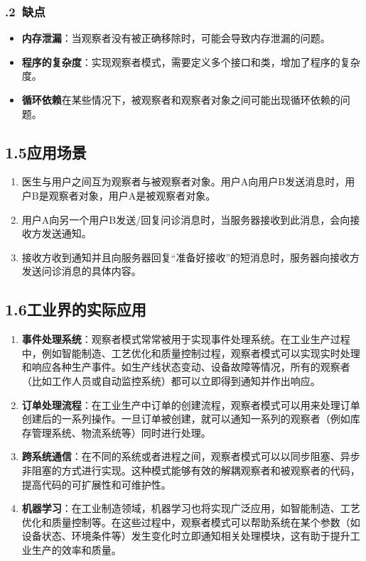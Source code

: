 \documentclass[24pt,a4paper]{article}%
\begin{document}
\subsubsection*{.2\ 缺点}
\begin{itemize}
    \item \textbf{内存泄漏}：当观察者没有被正确移除时，可能会导致内存泄漏的问题。
    \item \textbf{程序的复杂度}：实现观察者模式，需要定义多个接口和类，增加了程序的复杂度。
    \item \textbf{循环依赖}在某些情况下，被观察者和观察者对象之间可能出现循环依赖的问题。
\end{itemize}

\subsection*{\songti 1.5应用场景}
\begin{enumerate}
    \item 医生与用户之间互为观察者与被观察者对象。用户A向用户B发送消息时，用户B是观察者对象，用户A是被观察者对象。
    \item 用户A向另一个用户B发送/回复问诊消息时，当服务器接收到此消息，会向接收方发送通知。
    \item 接收方收到通知并且向服务器回复“准备好接收”的短消息时，服务器向接收方发送问诊消息的具体内容。
\end{enumerate}

\subsection*{\songti 1.6工业界的实际应用}
\begin{enumerate}
    \item \textbf{事件处理系统}：观察者模式常常被用于实现事件处理系统。在工业生产过程中，例如智能制造、工艺优化和质量控制过程，观察者模式可以实现实时处理和响应各种生产事件。如生产线状态变动、设备故障等情况，所有的观察者（比如工作人员或自动监控系统）都可以立即得到通知并作出响应。
    \item \textbf{订单处理流程}：在工业生产中订单的创建流程，观察者模式可以用来处理订单创建后的一系列操作。一旦订单被创建，就可以通知一系列的观察者（例如库存管理系统、物流系统等）同时进行处理。
    \item \textbf{跨系统通信}：在不同的系统或者进程之间，观察者模式可以以同步阻塞、异步非阻塞的方式进行实现。这种模式能够有效的解耦观察者和被观察者的代码，提高代码的可扩展性和可维护性。
    \item \textbf{机器学习}：在工业制造领域，机器学习也将实现广泛应用，如智能制造、工艺优化和质量控制等。在这些过程中，观察者模式可以帮助系统在某个参数（如设备状态、环境条件等）发生变化时立即通知相关处理模块，这有助于提升工业生产的效率和质量。
\end{enumerate}
\end{document}
